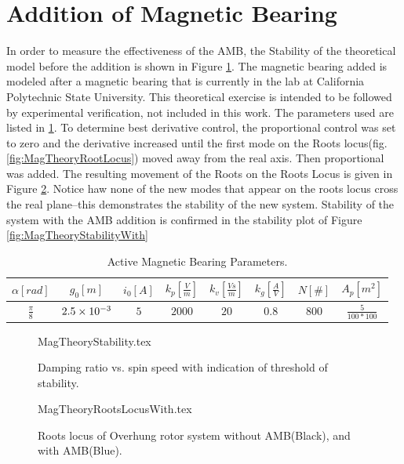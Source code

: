 \section{Addition of Magnetic Bearing}
In order to measure the effectiveness of the AMB, the Stability of the theoretical model before the addition is shown in Figure \ref{fig:MagTheoryStability}. The magnetic bearing added is modeled after a magnetic bearing that is currently in the lab at California Polytechnic State University. This theoretical exercise is intended to be followed by experimental verification, not included in this work. The parameters used are listed in \ref{tab:MagBearingParameters}. To determine best derivative control, the proportional control was set to zero and the derivative increased until the first mode on the Roots locus(fig. \ref{fig:MagTheoryRootLocus}) moved away from the real axis. Then proportional was added. The resulting movement of the Roots on the Roots Locus is given in Figure \ref{fig:MagTheoryRootsLocusWith}. Notice haw none of the new modes that appear on the roots locus cross the real plane--this demonstrates the stability of the new system. Stability of the system with the AMB addition is confirmed in the stability plot of Figure \ref{fig:MagTheoryStabilityWith}
\begin{table}
	\centering\label{tab:MagBearingParameters}
	\caption{Active Magnetic Bearing Parameters.}
	\begin{tabular}{cccccccc}
		$\alpha[rad]$&$g_0[m]$&$i_0[A]$&$k_p[\frac{V}{m}]$&$k_v[\frac{Vs}{m}]$&$k_g[\frac{A}{V}]$&$ N[\#]$&$A_p[m^2]$\\\hline
		$\frac{\pi}{8}$&$2.5\times 10^{-3}$&$5$&$2000$&$20$&$0.8$&$800$&$\frac{5}{100*100}$
		\end{tabular}
\end{table}
\begin{figure}[!htb]
	\def\width{.6\linewidth}
	\def\height{.4\linewidth}
	\def\sep{3em}
	\centering
	{MagTheoryStability.tex}
	\caption{Damping ratio vs. spin speed with indication of threshold of stability.}
	\label{fig:MagTheoryStability}
\end{figure}
\begin{figure}[!htb]
	\def\width{.6\linewidth}
	\def\height{.4\linewidth}
	\def\sep{3em}
	\centering
	{MagTheoryRootsLocusWith.tex}
	\caption{Roots locus of Overhung rotor system without AMB(Black), and with AMB(Blue).}
	\label{fig:MagTheoryRootsLocusWith}
\end{figure}
